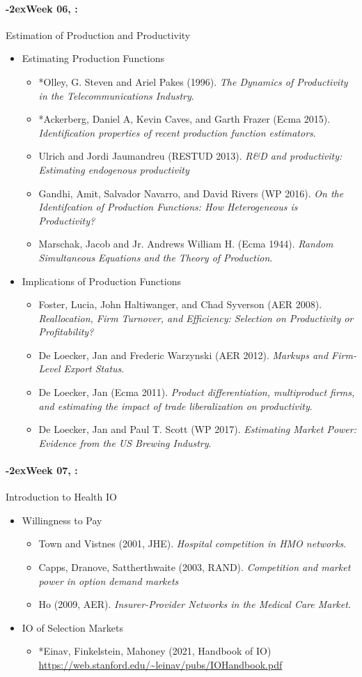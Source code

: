 \documentclass[11pt]{article}
\newcommand{\week}[1]{%
  \paragraph*{\kern-2ex\quad #1, \syldate{\today}:}%
  \AdvanceDate[7]%
}
\begin{document}
\week{Week 06} Estimation of Production and Productivity
\begin{itemize}
\item Estimating Production Functions
\begin{itemize}
\item *Olley, G. Steven and Ariel Pakes (1996). \textit{The Dynamics of Productivity in the Telecommunications Industry}.
\item  *Ackerberg, Daniel A, Kevin Caves, and Garth Frazer (Ecma 2015). \textit{Identification properties of recent production function estimators}.
\item Ulrich and Jordi Jaumandreu (RESTUD 2013). \textit{R\&D and productivity: Estimating endogenous productivity}
\item Gandhi, Amit, Salvador Navarro, and David Rivers (WP 2016). \textit{On the Identifcation of Production Functions: How Heterogeneous is Productivity?}
\item Marschak, Jacob and Jr. Andrews William H. (Ecma 1944). \textit{Random Simultaneous Equations and the Theory of Production}.
\end{itemize}
\item Implications of Production Functions
\begin{itemize}
\item Foster, Lucia, John Haltiwanger, and Chad Syverson (AER 2008). \textit{Reallocation, Firm Turnover, and Efficiency: Selection on Productivity or Profitability?}
\item De Loecker, Jan and Frederic Warzynski (AER 2012). \textit{Markups and Firm-Level Export Status}.
\item De Loecker, Jan (Ecma 2011). \textit{Product differentiation, multiproduct firms, and estimating the impact of trade liberalization on productivity}.
\item De Loecker, Jan and Paul T. Scott (WP 2017). \textit{Estimating Market Power: Evidence from the US Brewing Industry}.
\end{itemize}
\end{itemize}




\week{Week 07} Introduction to Health IO
\begin{itemize}
\item Willingness to Pay
\begin{itemize}
\item Town and Vistnes (2001, JHE). \textit{Hospital competition in HMO networks}.
\item Capps, Dranove, Sattherthwaite (2003, RAND). \textit{Competition and market power in option demand markets}
\item Ho (2009, AER). \textit{Insurer-Provider Networks in the Medical Care Market}.
\end{itemize}
\item IO of Selection Markets
\begin{itemize}
  \item *Einav, Finkelstein, Mahoney (2021, Handbook of IO) \url{https://web.stanford.edu/~leinav/pubs/IOHandbook.pdf}
\end{itemize}
\end{itemize}
\end{document}
